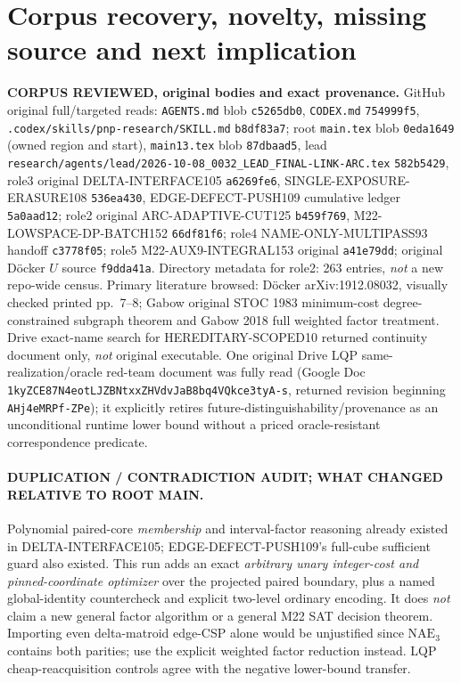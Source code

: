 \documentclass[11pt]{article}
\begin{document}
\section{Corpus recovery, novelty, missing source and next implication}
\textbf{CORPUS REVIEWED, original bodies and exact provenance.} GitHub original full/targeted reads: \texttt{AGENTS.md} blob \texttt{c5265db0}, \texttt{CODEX.md} \texttt{754999f5}, \texttt{.codex/skills/pnp-research/SKILL.md} \texttt{b8df83a7}; root \texttt{main.tex} blob \texttt{0eda1649} (owned region and start), \texttt{main13.tex} blob \texttt{87dbaad5}, lead \texttt{research/agents/lead/2026-10-08\_0032\_LEAD\_FINAL-LINK-ARC.tex} \texttt{582b5429}, role3 original DELTA-INTERFACE105 \texttt{a6269fe6}, SINGLE-EXPOSURE-ERASURE108 \texttt{536ea430}, EDGE-DEFECT-PUSH109 cumulative ledger \texttt{5a0aad12}; role2 original ARC-ADAPTIVE-CUT125 \texttt{b459f769}, M22-LOWSPACE-DP-BATCH152 \texttt{66df81f6}; role4 NAME-ONLY-MULTIPASS93 handoff \texttt{c3778f05}; role5 M22-AUX9-INTEGRAL153 original \texttt{a41e79dd}; original D\"ocker $U$ source \texttt{f9dda41a}. Directory metadata for role2: 263 entries, \emph{not} a new repo-wide census. Primary literature browsed: D\"ocker arXiv:1912.08032, visually checked printed pp.~7--8; Gabow original STOC 1983 minimum-cost degree-constrained subgraph theorem and Gabow 2018 full weighted factor treatment. Drive exact-name search for HEREDITARY-SCOPED10 returned continuity document only, \emph{not} original executable. One original Drive LQP same-realization/oracle red-team document was fully read (Google Doc \texttt{1kyZCE87N4eotLJZBNtxxZHVdvJaB8bq4VQkce3tyA-s}, returned revision beginning \texttt{AHj4eMRPf-ZPe}); it explicitly retires future-distinguishability/provenance as an unconditional runtime lower bound without a priced oracle-resistant correspondence predicate.

\paragraph{DUPLICATION / CONTRADICTION AUDIT; WHAT CHANGED RELATIVE TO ROOT MAIN.} Polynomial paired-core \emph{membership} and interval-factor reasoning already existed in DELTA-INTERFACE105; EDGE-DEFECT-PUSH109's full-cube sufficient guard also existed. This run adds an exact \emph{arbitrary unary integer-cost and pinned-coordinate optimizer} over the projected paired boundary, plus a named global-identity countercheck and explicit two-level ordinary encoding. It does \emph{not} claim a new general factor algorithm or a general M22 SAT decision theorem. Importing even delta-matroid edge-CSP alone would be unjustified since $\mathrm{NAE}_3$ contains both parities; use the explicit weighted factor reduction instead. LQP cheap-reacquisition controls agree with the negative lower-bound transfer.
\end{document}
